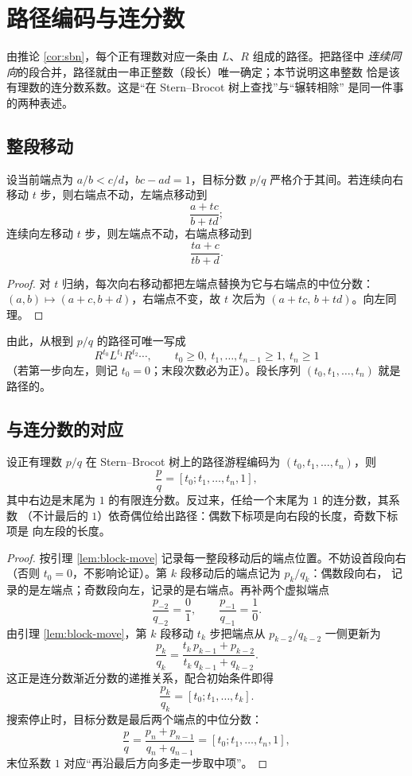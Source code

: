\section{路径编码与连分数}\label{sec:cf}

由推论 \ref{cor:sbn}，每个正有理数对应一条由 $L$、$R$ 组成的路径。把路径中
\emph{连续同向}的段合并，路径就由一串正整数（段长）唯一确定；本节说明这串整数
恰是该有理数的连分数系数。这是``在 Stern--Brocot 树上查找''与``辗转相除''
是同一件事的两种表述。

\subsection{整段移动}

\begin{lemma}[整段移动的端点公式]\label{lem:block-move}
设当前端点为 $a/b<c/d$，$bc-ad=1$，目标分数 $p/q$ 严格介于其间。若连续向右
移动 $t$ 步，则右端点不动，左端点移动到
\[
  \frac{a+tc}{b+td};
\]
连续向左移动 $t$ 步，则左端点不动，右端点移动到
\[
  \frac{ta+c}{tb+d}.
\]
\end{lemma}

\begin{proof}
对 $t$ 归纳，每次向右移动都把左端点替换为它与右端点的中位分数：
$(a,b)\mapsto(a+c,b+d)$，右端点不变，故 $t$ 次后为 $(a+tc,\,b+td)$。向左同理。
\end{proof}

由此，从根到 $p/q$ 的路径可唯一写成
\[
  R^{t_0}L^{t_1}R^{t_2}\cdots,
  \qquad t_0\ge 0,\ t_1,\ldots,t_{n-1}\ge 1,\ t_n\ge 1
\]
（若第一步向左，则记 $t_0=0$；末段次数必为正）。段长序列 $(t_0,t_1,\ldots,t_n)$
就是路径的。

\subsection{与连分数的对应}

\begin{theorem}[路径的连分数编码]\label{thm:cf-encoding}
设正有理数 $p/q$ 在 Stern--Brocot 树上的路径游程编码为
$(t_0,t_1,\ldots,t_n)$，则
\[
  \frac pq=[t_0;t_1,\ldots,t_n,1],
\]
其中右边是末尾为 $1$ 的有限连分数。反过来，任给一个末尾为 $1$ 的连分数，其系数
（不计最后的 $1$）依奇偶位给出路径：偶数下标项是向右段的长度，奇数下标项是
向左段的长度。
\end{theorem}

\begin{proof}
按引理 \ref{lem:block-move} 记录每一整段移动后的端点位置。不妨设首段向右
（否则 $t_0=0$，不影响论证）。第 $k$ 段移动后的端点记为 $p_k/q_k$：偶数段向右，
记录的是左端点；奇数段向左，记录的是右端点。再补两个虚拟端点
\[
  \frac{p_{-2}}{q_{-2}}=\frac01,\qquad \frac{p_{-1}}{q_{-1}}=\frac10.
\]
由引理 \ref{lem:block-move}，第 $k$ 段移动 $t_k$ 步把端点从 $p_{k-2}/q_{k-2}$
一侧更新为
\[
  \frac{p_k}{q_k}=\frac{t_k\,p_{k-1}+p_{k-2}}{t_k\,q_{k-1}+q_{k-2}}.
\]
这正是连分数渐近分数的递推关系，配合初始条件即得
\[
  \frac{p_k}{q_k}=[t_0;t_1,\ldots,t_k].
\]
搜索停止时，目标分数是最后两个端点的中位分数：
\[
  \frac pq=\frac{p_n+p_{n-1}}{q_n+q_{n-1}}=[t_0;t_1,\ldots,t_n,1],
\]
末位系数 $1$ 对应``再沿最后方向多走一步取中项''。
\end{proof}

